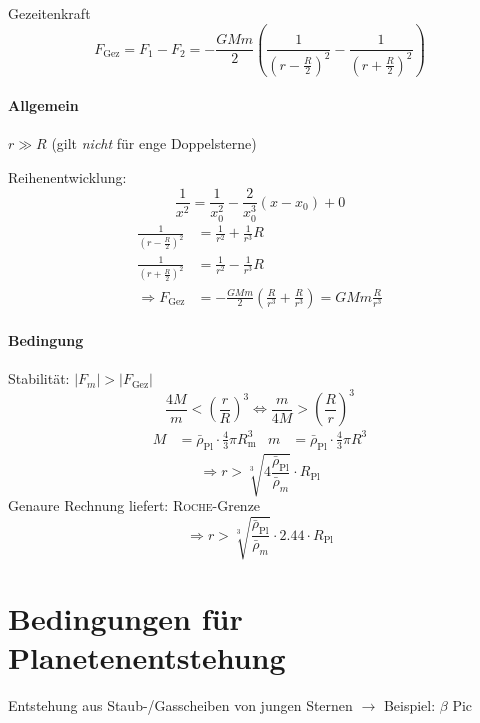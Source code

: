 \begin{definition}
    Gezeitenkraft
    \[ F_{\mathrm{Gez}} = F_1 - F_2 = - \frac{GMm}{2} \left(\frac{1}{\left(r-\frac{R}{2}\right)^2} - \frac{1}{\left(r+\frac{R}{2}\right)^2}\right) \]
\end{definition}

\paragraph{Allgemein} $r \gg R$ (gilt \emph{nicht} für enge Doppelsterne)

Reihenentwicklung:
\[ \frac{1}{x^2} = \frac{1}{x_0^2} - \frac{2}{x_0^3} (x-x_0) + 0\]
\begin{align*}
    \frac{1}{\left(r - \frac{R}{2}\right)^2} &= \frac{1}{r^2} + \frac{1}{r^3} R\\
    \frac{1}{\left(r + \frac{R}{2}\right)^2} &= \frac{1}{r^2} - \frac{1}{r^3} R\\
    \Rightarrow F_{\mathrm{Gez}} &= -\frac{GMm}{2} \left(\frac{R}{r^3} + \frac{R}{r^3}\right) = G M m \frac{R}{r^3}
\end{align*}

\paragraph{Bedingung} Stabilität: $|F_m| > |F_{\mathrm{Gez}}|$
\[ \frac{4M}{m} < \left(\frac{r}{R}\right)^3 \Leftrightarrow \frac{m}{4M} > \left(\frac{R}{r}\right)^3 \]
\begin{align*}
    M &= \bar \rho_{\mathrm{Pl}} \cdot \frac{4}{3} \pi R_{\mathrm{m}}^3 & m &= \bar \rho_{\mathrm{Pl}} \cdot \frac{4}{3} \pi R^3
\end{align*}
\[ \Rightarrow r > \sqrt[3]{4 \frac{\bar \rho_{\mathrm{Pl}}}{\bar \rho_{m}}} \cdot R_{\mathrm{Pl}} \]
Genaure Rechnung liefert: \textsc{Roche}-Grenze
\[ \Rightarrow r > \sqrt[3]{\frac{\bar \rho_{\mathrm{Pl}}}{\bar \rho_{m}}} \cdot 2.44 \cdot R_{\mathrm{Pl}} \]

\section{Bedingungen für Planetenentstehung}
Entstehung aus Staub-/Gasscheiben von jungen Sternen $\rightarrow$ Beispiel: $\beta$ Pic

